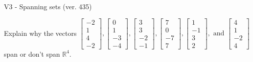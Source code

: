 \begin{exercise}
  \begin{exerciseTitle}V3 - Spanning sets (ver. 435)\end{exerciseTitle}
  \begin{exerciseStatement}
    Explain why the vectors \(\left[\begin{array}{r}
-2 \\
1 \\
4 \\
-2
\end{array}\right] , \left[\begin{array}{r}
0 \\
1 \\
-3 \\
-4
\end{array}\right] , \left[\begin{array}{r}
3 \\
3 \\
-2 \\
-1
\end{array}\right] , \left[\begin{array}{r}
7 \\
0 \\
-7 \\
7
\end{array}\right] , \left[\begin{array}{r}
1 \\
-1 \\
3 \\
2
\end{array}\right] , \text{ and } \left[\begin{array}{r}
4 \\
1 \\
-2 \\
4
\end{array}\right]\) span or don't span \(\mathbb{R}^4\). 
	



\end{exerciseStatement}
\end{exercise}

